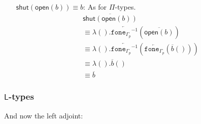 \documentclass[10pt]{article}
\theoremstyle{definition}
\newcommand{\rewrite}[2]{\overleftarrow{#1}(#2)}
\newcommand\UE[2]{\ensuremath{#1(#2)}}
\newcommand\UI[2]{\ensuremath{\lambda #1.#2}}
\newcommand{\modeof}[1]{{#1}_p}
\newcommand{\upstairs}[1]{\overline{#1}}
\newcommand\fone[1]{\ensuremath{\mathtt{fone}_{#1}}}
\newcommand\foneinv[1]{\ensuremath{\fone{#1}^{-1}}}
\newcommand{\RI}[1]{\mathsf{shut}({#1})}
\newcommand{\RE}[1]{\mathsf{open}({#1})}
\begin{document}
\begin{enumerate}
\item[{$\RI{\RE{b}} \equiv b$}:] As for $\Pi$-types.
\begin{align*}
&\upstairs{\RI{\RE{b}}} \\
&\equiv \UI{()}{\rewrite{\foneinv{\modeof{\Gamma}}}{\upstairs{\RE{b}}}} \\
&\equiv \UI{()}{\rewrite{\foneinv{\modeof{\Gamma}}}{\rewrite{\fone{\modeof{\Gamma}}}{\UE{\upstairs{b}}{}}}} \\
&\equiv \UI{()}{\UE{\upstairs{b}}{}} \\
&\equiv \upstairs{b}
\end{align*}
\end{enumerate}

\subsubsection{$\mathsf{L}$-types}

And now the left adjoint:
\end{document}
